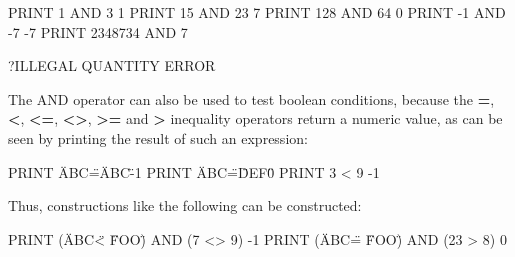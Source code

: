 \begin{screenoutput}
  PRINT 1 AND 3
  1
  PRINT 15 AND 23
  7
  PRINT 128 AND 64
  0
  PRINT -1 AND -7
  -7
  PRINT 2348734 AND 7

  ?ILLEGAL QUANTITY ERROR
\end{screenoutput}

The AND operator can also be used to test boolean conditions, because the {\bf =}, {\bf <}, {\bf <=}, {\bf <>}, {\bf >=} and {\bf >} inequality operators return a numeric value, as can be seen by printing the result of such an expression:

\begin{screenoutput}
  PRINT \"ABC\"=\"ABC\"
  -1
  PRINT \"ABC\"=\"DEF\"
  0
  PRINT 3 < 9
  -1
\end{screenoutput}

Thus, constructions like the following can be constructed:

\begin{screenoutput}
  PRINT (\"ABC\" < \"FOO\") AND (7 <> 9)
  -1
  PRINT (\"ABC\" = \"FOO\") AND (23 > 8)
  0
\end{screenoutput}
